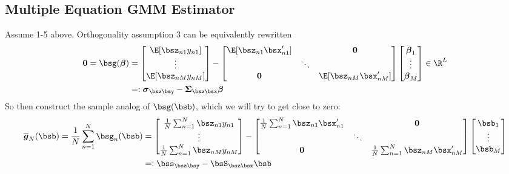 \documentclass[12pt]{article}
\theoremstyle{plain}
\theoremstyle{definition}
\theoremstyle{remark}
\newcommand{\bsSigma}{\boldsymbol{\Sigma}}
\newcommand{\bssigma}{\boldsymbol{\sigma}}
\newcommand{\bsbeta}{\boldsymbol{\beta}}
\newcommand{\bsbarg}{\boldsymbol{\overline{g}}}
\renewcommand{\bso}{\boldsymbol{0}}
\newcommand{\sumnN}{\sum^N_{n=1}}
\begin{document}
\clearpage
\subsection{Multiple Equation GMM Estimator}
\label{subsec:EndogenousRegressorMultipleGMM}

Assume 1-5 above.  Orthogonality assumption 3 can be equivalently
rewritten
\begin{align*}
  \bso
  = \bsg(\bsbeta)
  &=
  \begin{bmatrix}
    \E[\bsz_{n1}y_{n1}] \\
    \vdots\\
    \E[\bsz_{nM}y_{nM}] \\
  \end{bmatrix}
  -
  \begin{bmatrix}
    \E[\bsz_{n1}\bsx_{n1}'] &  &\bso\\
    & \ddots & \\
    \bso&& \E[\bsz_{nM}\bsx_{nM}'] \\
  \end{bmatrix}
  \begin{bmatrix}
    \bsbeta_1 \\
    \vdots \\
    \bsbeta_M \\
  \end{bmatrix}
  \in \R^L
  \\
  &=: \bssigma_{\bsz\bsy} - \bsSigma_{\bsz\bsx}\bsbeta
\end{align*}
So then construct the sample analog of $\bsg(\bsb)$, which we will try
to get close to zero:
\begin{align*}
  \bsbarg_N(\bsb) =
  \frac{1}{N}\sumnN \bsg_n(\bsb)
  &=
  \begin{bmatrix}
    \frac{1}{N}\sumnN \bsz_{n1}y_{n1} \\
    \vdots\\
    \frac{1}{N}\sumnN\bsz_{nM}y_{nM} \\
  \end{bmatrix}
  -
  \begin{bmatrix}
    \frac{1}{N}\sumnN\bsz_{n1}\bsx_{n1}' &  &\bso\\
    & \ddots & \\
    \bso&& \frac{1}{N}\sumnN\bsz_{nM}\bsx_{nM}' \\
  \end{bmatrix}
  \begin{bmatrix}
    \bsb_1 \\
    \vdots \\
    \bsb_M \\
  \end{bmatrix} \\
  &=: \bss_{\bsz\bsy} - \bsS_{\bsz\bsx}\bsb
\end{align*}
\end{document}
